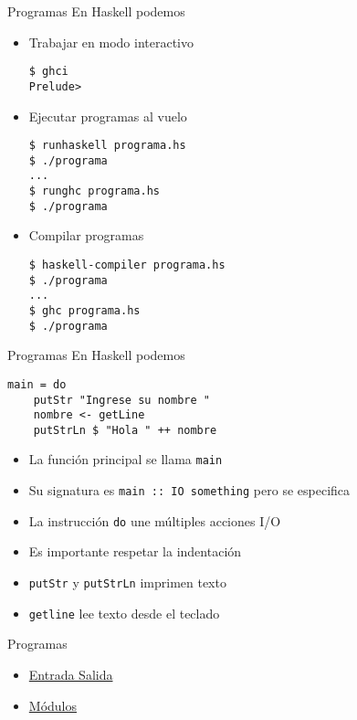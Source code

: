 \begin{frame}[fragile]{Programas}
    En Haskell podemos
    \begin{itemize}
        \item Trabajar en modo interactivo
        \begin{lstlisting}[style=consola]
$ ghci
Prelude>
        \end{lstlisting}
        \item Ejecutar programas al vuelo
        \begin{lstlisting}[style=consola]
$ runhaskell programa.hs
$ ./programa
...
$ runghc programa.hs
$ ./programa
        \end{lstlisting}
        \item Compilar programas
        \begin{lstlisting}[style=consola]
$ haskell-compiler programa.hs
$ ./programa
...
$ ghc programa.hs
$ ./programa
        \end{lstlisting}
    \end{itemize}
\end{frame}

\begin{frame}[fragile]{Programas}
    En Haskell podemos
    \begin{lstlisting}[style=consola]
main = do
    putStr "Ingrese su nombre "
    nombre <- getLine
    putStrLn $ "Hola " ++ nombre
    \end{lstlisting}
    \begin{itemize}
        \item La función principal se llama \verb|main|
        \item Su signatura es \verb|main :: IO something| pero se especifica
        \item La instrucción \verb|do| une múltiples acciones I/O
        \item Es importante respetar la indentación
        \item \verb|putStr| y \verb|putStrLn| imprimen texto
        \item \verb|getline| lee texto desde el teclado
    \end{itemize}
\end{frame}


\begin{frame}[fragile]{Programas}
    \begin{itemize}
        \item \href{http://learnyouahaskell.com/input-and-output}{Entrada Salida}
        \item \href{http://learnyouahaskell.com/modules}{Módulos}
    \end{itemize}
\end{frame}


